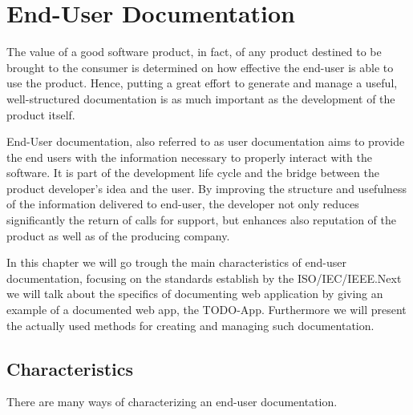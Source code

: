\chapter{End-User Documentation}\label{ch:userDoc}
The value of a good software product, in fact, of any product destined to be brought to the consumer is determined on how effective the end-user is able to use the product. Hence, putting a great effort to generate and manage a useful, well-structured documentation is as much important as the development of the product itself. 

End-User documentation, also referred to as user documentation aims to provide the end users with the information necessary to properly interact with the software. It is part of the development life cycle and the bridge between the product developer's idea and the user. By improving the structure and usefulness of the information delivered to end-user, the developer not only reduces significantly the return of calls for support, but enhances also reputation of the product as well as of the producing company\cite{8584518}.

In this chapter we will go trough the main characteristics of end-user documentation, focusing on the standards establish by the ISO/IEC/IEEE.\@ Next we will talk about the specifics of documenting web application by giving an example of a documented web app, the TODO-App. Furthermore we will present the actually used methods for creating and managing such documentation.
\section{Characteristics}
There are many ways of characterizing an end-user documentation.